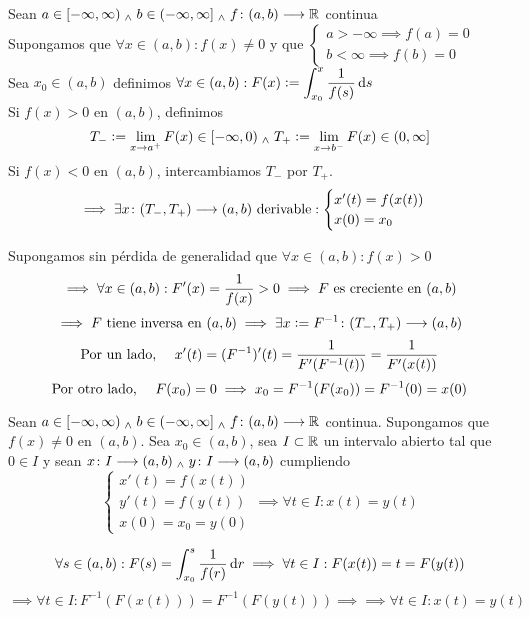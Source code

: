 
\begin{teo}
	Sean $a\in [-\infty, \infty) \; _{\wedge} \; b\in (-\infty, \infty] \; _{\wedge} \; f \colon (a,b) \longrightarrow \mathbb{R}$ continua \\
	Supongamos que $\forall x \in (a,b) : f(x) \ne 0$ y que $\begin{cases}
		a>-\infty \implies f(a)=0 \\
		b<\infty \implies f(b)=0
	\end{cases}$ \\
	Sea $x_0 \in (a,b)$ definimos $\ds \forall x \in (a,b) : F(x)\defeq\int_{x_0}^{x} \frac{1}{f(s)} \odif{s}$ \\
	Si $f(x)>0$ en $(a,b)$, definimos 
	$$\displaystyle T_-\vcentcolon= \lim_{x\to a^+}F(x)\in [-\infty, 0) \; _{\wedge} \; T_+\vcentcolon= \lim_{x\to b^-}F(x) \in (0, \infty]$$
	Si $f(x) < 0$ en $(a,b)$, intercambiamos $T_-$ por $T_+$.
	\[\implies \exists x \colon (T_-, T_+) \longrightarrow (a,b) \text{ derivable}: \begin{cases}
		x'(t)=f(x(t)) \\
		x(0)=x_0
	\end{cases}\]
	\begin{dem}
		Supongamos sin pérdida de generalidad que $\forall x \in (a,b) : f(x)>0$
		\[\implies \forall x \in (a,b) : F'(x)=\frac{1}{f(x)}>0 \implies F \text{ es creciente en }(a,b)\]
		\[\implies F \text{ tiene inversa en } (a, b) \implies \exists x\vcentcolon= F^{-1} \colon (T_-,T_+) \longrightarrow (a,b)\]
		\[\text{Por un lado, }\quad x'(t) = (F^{-1})'(t)=\frac{1}{F'(F^{-1}(t))}=\frac{1}{F'(x(t))}\]
		\[\text{Por otro lado, }\quad F(x_0)=0 \implies x_0= F^{-1}(F(x_0))=F^{-1}(0)=x(0)\]
	\end{dem}
\end{teo}

\begin{teo}
	Sean $a\in [-\infty, \infty) \; _{\wedge} \; b\in (-\infty, \infty] \; _{\wedge} \; f \colon (a,b) \longrightarrow \mathbb{R}$ continua. Supongamos que $f(x)\ne 0$ en $(a,b)$. Sea $x_0 \in (a,b)$, sea $I\subset \mathbb{R}$ un intervalo abierto tal que $0\in I$ y sean $x \colon I \longrightarrow (a,b) \; _{\wedge} \; y \colon I \longrightarrow (a,b)$ cumpliendo
	\[\begin{cases}
		x'(t)=f(x(t)) \\
		y'(t)=f(y(t)) \\
		x(0)=x_0=y(0)
	\end{cases} \implies \forall t \in I : x(t)=y(t)\]
	\begin{dem}
		\[\forall s \in (a,b) : F(s)=\int_{x_0}^{s} \frac{1}{f(r)}\odif{r} \implies \forall t \in I : F(x(t))=t=F(y(t))\]
		\[\implies \forall t \in I : F^{-1}(F(x(t)))=F^{-1}(F(y(t))) \implies \implies \forall t \in I : x(t)=y(t)\]
	\end{dem}
\end{teo}

